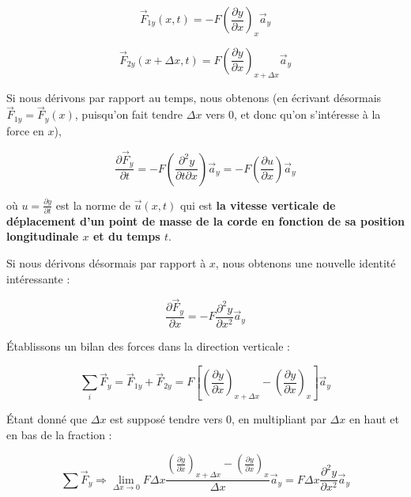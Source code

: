 \begin{equation}
\vec{F}_{1y}(x,t) = - F  \left(\frac{\partial y}{\partial x}\right)_{x}  \vec{a}_{y} 
\label{Force1}
\end{equation}

\begin{equation}
\vec{F}_{2y}(x+\Delta x,t) = F \left(\frac{\partial y}{\partial x}\right)_{x+\Delta x} \vec{a}_{y}
\label{Force2}
\end{equation}

Si nous dérivons par rapport au temps, nous obtenons (en écrivant désormais $\vec{F}_{1y} = \vec{F}_{y}(x)$, puisqu'on fait tendre $\Delta x$ vers $0$, et donc qu'on s'intéresse à la force en $x$),

\begin{equation}
\frac{\partial \vec{F}_{y}}{\partial t} = - F \left(\frac{\partial^{2} y}{\partial t \partial x}\right) \vec{a}_{y} = - F \left(\frac{\partial u}{\partial x}\right) \vec{a}_{y}
\label{Force4}
\end{equation}

où $u=\frac{\partial y}{\partial t}$ est la norme de $\vec{u}(x,t)$ qui est \textbf{la vitesse verticale de déplacement d'un point de masse de la corde en fonction de sa position longitudinale $x$ et du temps $t$}.

Si nous dérivons désormais par rapport à $x$, nous obtenons une nouvelle identité intéressante : 

\begin{equation}
\frac{\partial \vec{F}_{y}}{\partial x} = -F \frac{\partial^{2} y}{\partial x^{2}} \vec{a}_{y} 
\label{ForceLOL}
\end{equation}

Établissons un bilan des forces dans la direction verticale : 

\[\sum_{i} \vec{F}_{y} = \vec{F}_{1y} + \vec{F}_{2y}  = F \left[\left(\frac{\partial y}{\partial x}\right)_{x+\Delta x} - \left(\frac{\partial y}{\partial x}\right)_{x}\right] \vec{a}_{y} \]

Étant donné que $\Delta x$ est supposé tendre vers $0$, en multipliant par $\Delta x$ en haut et en bas de la fraction : 

\begin{equation}
\sum \vec{F}_{y} \Rightarrow \lim_{\Delta x \to 0}  F \Delta x \frac{\left(\frac{\partial y}{\partial x}\right)_{x+\Delta x} - \left(\frac{\partial y}{\partial x}\right)_{x}}{\Delta x} \vec{a}_{y} = F \Delta x \frac{\partial^{2} y }{\partial x^{2}} \vec{a}_{y} 
\label{Force5}
\end{equation}

